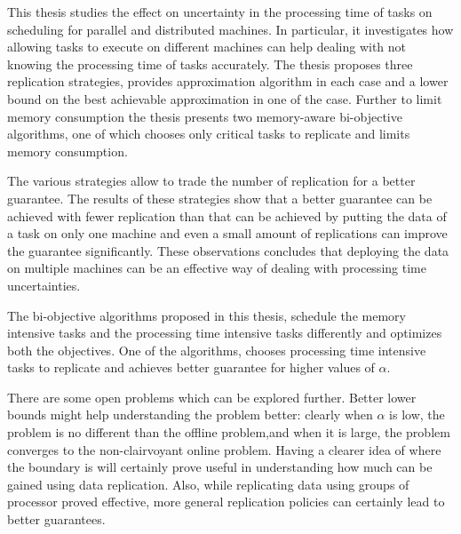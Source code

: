 \documentclass[12pt]{article}
\theoremstyle{mystyle}
\begin{document}
                 
    \label{ch6}
            
    This thesis studies the effect on uncertainty in the processing time of tasks on scheduling for parallel and distributed machines. In particular, it investigates how allowing tasks to execute on different machines can help dealing with not knowing the processing time of tasks accurately. The thesis proposes three replication strategies, provides approximation algorithm in each case and a lower bound on the best achievable approximation in one of the case. Further to limit memory consumption the thesis presents two memory-aware bi-objective algorithms, one of which chooses only critical tasks to replicate and limits memory consumption.
    
    The various strategies allow to trade the number of replication for a better guarantee. The results of these strategies show that a better guarantee can be achieved with fewer replication than that can be achieved by putting the data of a task on only one machine and even a small amount of replications can improve the guarantee significantly. These observations concludes that deploying the data on multiple machines can be an effective way of dealing with processing time uncertainties.
    
    The bi-objective algorithms proposed in this thesis, schedule the memory intensive tasks and the processing time intensive tasks differently and optimizes both the objectives. One of the algorithms, chooses processing time intensive tasks to replicate and achieves better guarantee for higher values of $\alpha$.
    
    There are some open problems which can be explored further. Better lower bounds might help understanding the problem better: clearly when $\alpha$ is low, the problem is no different than the offline problem,and when it is large, the problem converges to the non-clairvoyant online problem. Having a clearer idea of where the boundary is will certainly prove useful in understanding how much can be gained using data replication. Also, while replicating data using groups of processor proved effective, more general replication policies can certainly lead to better guarantees.
    
    
    
   
    
    

    
                  
                  
                                     
    
   



\startbib

 

\finishbib
\end{document}
